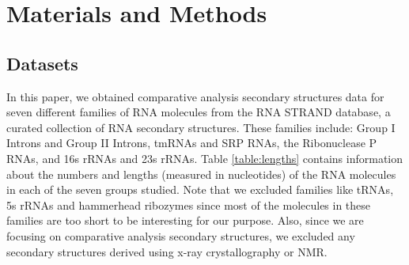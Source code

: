 \documentclass[10pt,letterpaper]{article}
\begin{document}
%
%
%

\section*{Materials and Methods}
\subsection*{Datasets}

In this paper, we obtained comparative analysis secondary structures data for seven different families of RNA molecules from the RNA STRAND database\cite{Andronescu2008-rj}, a curated collection of RNA secondary structures. These families include: Group I Introns and Group II Introns\cite{Cannone2002-tp}, tmRNAs and SRP RNAs\cite{Andersen2006-uh}, the Ribonuclease P RNAs\cite{Brown1999-co}, and 16s rRNAs and 23s rRNAs\cite{Cannone2002-tp}. Table \ref{table:lengths} contains information about the numbers and lengths (measured in nucleotides) of the RNA molecules in each of the seven groups studied. Note that we excluded families like tRNAs, 5s rRNAs and hammerhead ribozymes since most of the molecules in these families are too short to be interesting for our purpose. Also, since we are focusing on comparative analysis secondary structures, we excluded any secondary structures derived using x-ray crystallography or NMR.
\end{document}

